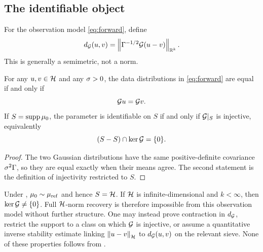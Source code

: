 \subsection{The identifiable object}

For the observation model \eqref{eq:forward}, define
\[
  d_{\mathcal{G}}(u,v)
  =\left\lVert\Gamma^{-1/2}\mathcal{G}(u-v)\right\rVert_{\mathbb{R}^k}.
\]
This is generally a semimetric, not a norm.

\begin{proposition}
\label{thm:ident}
For any $u,v\in\mathcal{H}$ and any $\sigma>0$, the data distributions in
\eqref{eq:forward} are equal if and only if
\begin{equation}
  \mathcal{G} u=\mathcal{G} v.
  \label{eq:observational-equivalence}
\end{equation}
If $S=\operatorname{supp}{\mu_{0}}$, the parameter is identifiable on $S$
if and only if $\mathcal{G}|_S$ is injective, equivalently
\begin{equation}
  (S-S)\cap\ker\mathcal{G}=\{0\}.
  \label{eq:support-identifiability}
\end{equation}
\end{proposition}

\begin{proof}
The two Gaussian distributions have the same positive-definite
covariance $\sigma^2\Gamma$, so they are equal exactly when their
means agree.  The second statement is the definition of injectivity
restricted to $S$.
\end{proof}

Under , ${\mu_{0}}\sim\mu_{\mathrm{ref}}$ and hence
$S=\mathcal{H}$.  If $\mathcal{H}$ is infinite-dimensional and $k<\infty$, then
$\ker\mathcal{G}\neq\{0\}$.  Full $\mathcal{H}$-norm recovery is therefore impossible
from this observation model without further structure.
One may instead prove contraction in $d_{\mathcal{G}}$, restrict the support to
a class on which $\mathcal{G}$ is injective, or assume a quantitative inverse
stability estimate linking $\left\lVert u-v\right\rVert_{\mathcal{H}}$ to $d_{\mathcal{G}}(u,v)$ on the
relevant sieve.  None of these properties follows from
.
